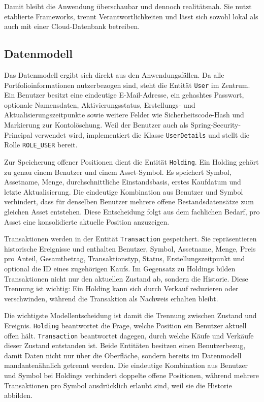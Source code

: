\documentclass[12pt,a4paper]{article}
\begin{document}
Damit bleibt die Anwendung überschaubar und dennoch realitätsnah. Sie nutzt etablierte Frameworks, trennt Verantwortlichkeiten und lässt sich sowohl lokal als auch mit einer Cloud-Datenbank betreiben.

\subsection{Datenmodell}

Das Datenmodell ergibt sich direkt aus den Anwendungsfällen. Da alle Portfolioinformationen nutzerbezogen sind, steht die Entität \texttt{User} im Zentrum. Ein Benutzer besitzt eine eindeutige E-Mail-Adresse, ein gehashtes Passwort, optionale Namensdaten, Aktivierungsstatus, Erstellungs- und Aktualisierungszeitpunkte sowie weitere Felder wie Sicherheitscode-Hash und Markierung zur Kontolöschung. Weil der Benutzer auch als Spring-Security-Principal verwendet wird, implementiert die Klasse \texttt{UserDetails} und stellt die Rolle \texttt{ROLE\_USER} bereit.

Zur Speicherung offener Positionen dient die Entität \texttt{Holding}. Ein Holding gehört zu genau einem Benutzer und einem Asset-Symbol. Es speichert Symbol, Assetname, Menge, durchschnittliche Einstandsbasis, erstes Kaufdatum und letzte Aktualisierung. Die eindeutige Kombination aus Benutzer und Symbol verhindert, dass für denselben Benutzer mehrere offene Bestandsdatensätze zum gleichen Asset entstehen. Diese Entscheidung folgt aus dem fachlichen Bedarf, pro Asset eine konsolidierte aktuelle Position anzuzeigen.

Transaktionen werden in der Entität \texttt{Transaction} gespeichert. Sie repräsentieren historische Ereignisse und enthalten Benutzer, Symbol, Assetname, Menge, Preis pro Anteil, Gesamtbetrag, Transaktionstyp, Status, Erstellungszeitpunkt und optional die ID eines zugehörigen Kaufs. Im Gegensatz zu Holdings bilden Transaktionen nicht nur den aktuellen Zustand ab, sondern die Historie. Diese Trennung ist wichtig: Ein Holding kann sich durch Verkauf reduzieren oder verschwinden, während die Transaktion als Nachweis erhalten bleibt.

Die wichtigste Modellentscheidung ist damit die Trennung zwischen Zustand und Ereignis. \texttt{Holding} beantwortet die Frage, welche Position ein Benutzer aktuell offen hält. \texttt{Transaction} beantwortet dagegen, durch welche Käufe und Verkäufe dieser Zustand entstanden ist. Beide Entitäten besitzen einen Benutzerbezug, damit Daten nicht nur über die Oberfläche, sondern bereits im Datenmodell mandantenähnlich getrennt werden. Die eindeutige Kombination aus Benutzer und Symbol bei Holdings verhindert doppelte offene Positionen, während mehrere Transaktionen pro Symbol ausdrücklich erlaubt sind, weil sie die Historie abbilden.
\end{document}
